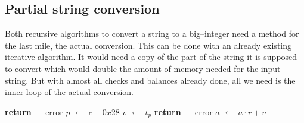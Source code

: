 \documentclass[a4paper,10pt]{article}
\newcommand*\Let[2]{\State #1 $\gets$ #2}
\newcommand{\RETURN}{\State \textbf{return} }
\theoremstyle{plain} %
\theoremstyle{definition}
\theoremstyle{remark}
\begin{document}
\subsection{Partial string conversion}
Both recursive algorithms to convert a string to a big--integer need a method for the last mile, the actual conversion. This can be done with an already existing iterative algorithm. It would need a copy of the part of the string it is supposed to convert which would double the amount of memory needed for the input--string.
But with almost all checks and balances already done, all we need is the inner loop of the actual conversion.

\begin{center}
\begin{minipage}{.9\linewidth}
  \begin{algorithmic}[1]
          \RETURN {$\quad$ error}
       \EndIf
       \Let{$p$}{$c - 0x28$}
       \State {}
       \Let{$v$}{$t_p$}
        
          \RETURN {$\quad$ error}
       \EndIf
       \Let{$a$}{$a \cdot r + v$}
    \EndFor
    \EndFunction
  \end{algorithmic}
\end{minipage}
\end{center}
\end{document}
